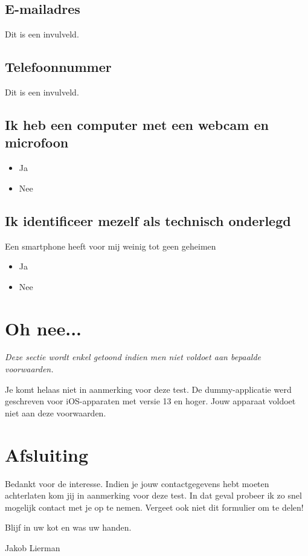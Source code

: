 \subsection*{E-mailadres}

Dit is een invulveld.

\subsection*{Telefoonnummer}

Dit is een invulveld.

\subsection*{Ik heb een computer met een webcam en microfoon}

\begin{itemize}
    \item Ja
    \item Nee
\end{itemize}

\subsection*{Ik identificeer mezelf als technisch onderlegd}

Een smartphone heeft voor mij weinig tot geen geheimen

\begin{itemize}
    \item Ja
    \item Nee
\end{itemize}

\section{Oh nee...}
\label{sec:voldoet-niet}

\textit{Deze sectie wordt enkel getoond indien men niet voldoet aan bepaalde voorwaarden.}

Je komt helaas niet in aanmerking voor deze test. De dummy-applicatie werd geschreven voor iOS-apparaten met versie 13 en hoger. Jouw apparaat voldoet niet aan deze voorwaarden.

\section{Afsluiting}

Bedankt voor de interesse. Indien je jouw contactgegevens hebt moeten achterlaten kom jij in aanmerking voor deze test. In dat geval probeer ik zo snel mogelijk contact met je op te nemen. Vergeet ook niet dit formulier om te delen!

Blijf in uw kot en was uw handen. 

Jakob Lierman
